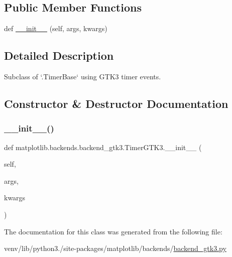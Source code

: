 \subsection*{Public Member Functions}
\begin{DoxyCompactItemize}
\item 
def \hyperlink{classmatplotlib_1_1backends_1_1backend__gtk3_1_1TimerGTK3_aefccdc94f46127e56d9b4b4a9af251ff}{\+\_\+\+\_\+init\+\_\+\+\_\+} (self, args, kwargs)
\end{DoxyCompactItemize}


\subsection{Detailed Description}
\begin{DoxyVerb}Subclass of `.TimerBase` using GTK3 timer events.\end{DoxyVerb}
 

\subsection{Constructor \& Destructor Documentation}
\mbox{\label{classmatplotlib_1_1backends_1_1backend__gtk3_1_1TimerGTK3_aefccdc94f46127e56d9b4b4a9af251ff}} 
\subsubsection{\texorpdfstring{\+\_\+\+\_\+init\+\_\+\+\_\+()}{\_\_init\_\_()}}
{\footnotesize\ttfamily def matplotlib.\+backends.\+backend\+\_\+gtk3.\+Timer\+G\+T\+K3.\+\_\+\+\_\+init\+\_\+\+\_\+ (\begin{DoxyParamCaption}\item[{}]{self,  }\item[{}]{args,  }\item[{}]{kwargs }\end{DoxyParamCaption})}



The documentation for this class was generated from the following file\+:\begin{DoxyCompactItemize}
\item 
venv/lib/python3./site-\/packages/matplotlib/backends/\hyperlink{backend__gtk3_8py}{backend\+\_\+gtk3.\+py}\end{DoxyCompactItemize}
